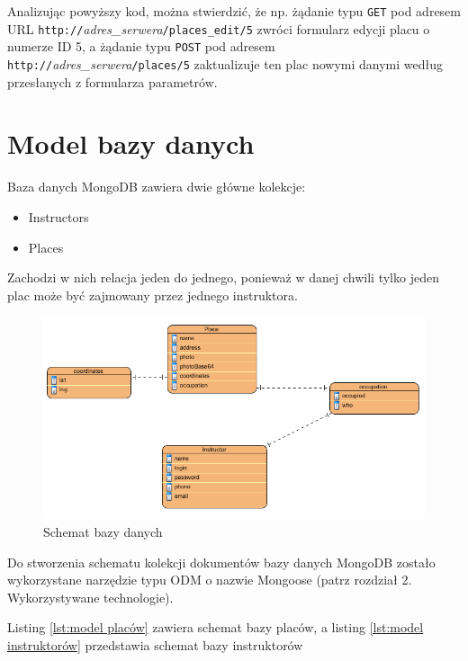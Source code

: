 \documentclass[twoside,a4paper,openright,12pt]{book}
\begin{document}
Analizując powyższy kod, można stwierdzić, że np. żądanie typu \texttt{GET} pod adresem URL \texttt{http://}\textit{adres\_serwera}\texttt{/places\_edit/5} zwróci formularz edycji placu o numerze ID 5, a żądanie typu \texttt{POST} pod adresem \texttt{http://}\textit{adres\_serwera}\texttt{/places/5} zaktualizuje ten plac nowymi danymi według przesłanych z formularza parametrów.


\section{Model bazy danych}

Baza danych MongoDB zawiera dwie główne kolekcje:
\begin{itemize}
\item{Instructors}
\item{Places}
\end{itemize}

Zachodzi w nich relacja jeden do jednego, ponieważ w danej chwili tylko jeden plac może być zajmowany przez jednego instruktora.

\begin{figure}[htbp]
\centering
\includegraphics[width=1\textwidth]{screenshots/uml/db_schema.png}
\caption{Schemat bazy danych}
\end{figure}

Do stworzenia schematu kolekcji dokumentów bazy danych MongoDB zostało wykorzystane narzędzie typu ODM o nazwie Mongoose (patrz rozdział 2. Wykorzystywane technologie).

Listing \ref{lst:model placów} zawiera schemat bazy placów, a listing \ref{lst:model instruktorów} przedstawia schemat bazy instruktorów
\end{document}
